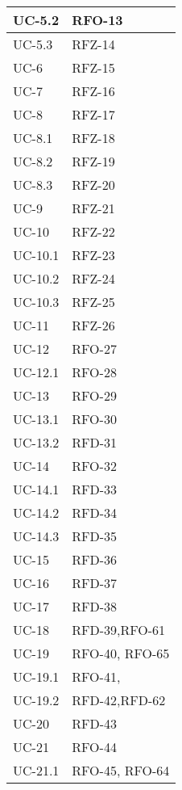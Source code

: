 \begin{xltabular}{\textwidth}{|X| X |}
    \hline
    UC-5.2 & RFO-13\\
    \hline
    UC-5.3 & RFZ-14 \\
    \hline
    UC-6 & RFZ-15\\
    \hline
    UC-7 & RFZ-16 \\
    \hline
    UC-8 & RFZ-17\\
    \hline
    UC-8.1 & RFZ-18\\
    \hline
    UC-8.2 & RFZ-19\\
    \hline
    UC-8.3 & RFZ-20\\
    \hline
    UC-9 & RFZ-21\\
    \hline
    UC-10 & RFZ-22\\
    \hline
    UC-10.1 & RFZ-23 \\
    \hline
    UC-10.2 & RFZ-24 \\
    \hline
    UC-10.3 & RFZ-25 \\
    \hline
    UC-11 & RFZ-26 \\
    \hline
    UC-12 & RFO-27\\
    \hline
    UC-12.1 & RFO-28\\
    \hline
    UC-13 & RFO-29\\
    \hline
    UC-13.1 & RFO-30 \\
    \hline
    UC-13.2 & RFD-31\\
    \hline
    UC-14 & RFO-32 \\
    \hline
    UC-14.1 & RFD-33  \\
    \hline
    UC-14.2 & RFD-34\\
    \hline
    UC-14.3 & RFD-35\\
    \hline
    UC-15 & RFD-36 \\
    \hline
    UC-16 & RFD-37\\
    \hline
    UC-17 & RFD-38 \\
    \hline
    UC-18 & RFD-39,\newline RFO-61  \\
    \hline
    UC-19 & RFO-40, \newline RFO-65 \\
    \hline
    UC-19.1 & RFO-41, \\
    \hline
    UC-19.2 & RFD-42,\newline RFD-62 \\
    \hline
    UC-20 & RFD-43 \\
    \hline
    UC-21 & RFO-44 \\
    \hline
    UC-21.1 & RFO-45, \newline RFO-64 \\

\end{xltabular}
